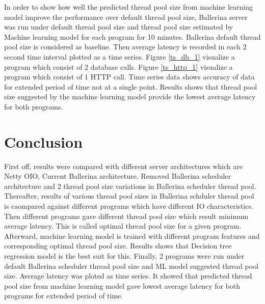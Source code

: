 In order to show how well the predicted thread pool size from machine learning model improve the performance over default thread pool size, Ballerina server was run under default thread pool size and thread pool size estimated by Machine learning model for each program for 10 minutes. Ballerina default thread pool size is considered as baseline. Then average latency is recorded in each 2 second time interval plotted as a time series. Figure \ref{ts_db_1} visualize a program which consist of 2 database calls. Figure \ref{ts_http_1} visualize a program which consist of 1 HTTP call. Time series data shows accuracy of data for extended period of time not at a single point. Results shows that thread pool size suggested by the machine learning model provide the lowest average latency for both programs.

\section{Conclusion}

First off, results were compared with different server architectures which are Netty OIO, Current Ballerina architecture, Removed Ballerina scheduler architecture and 2 thread pool size variations in Ballerina scheduler thread pool. Thereafter, results of various thread pool sizes in Ballerina schduler thread pool is caompared against different programs which have different IO characteristics. Then different programs gave different thread pool size which result minimum average latency. This is called optimal thread pool size for a given program. Afterward, machine learning model is trained with different program features and corresponding optimal thread pool size. Results shows that Decision tree regression model is the best suit for this. Finally,  2 programs were run under default Ballerina scheduler thread pool size and ML model suggested thread pool size. Average latency was ploted as time series. It showed that predicted thread pool size from machine learning model gave lowest average latency for both programs for extended period of time. 
